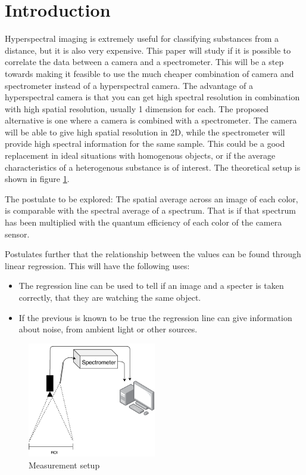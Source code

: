 \section{Introduction}
\label{sec:introduction}
Hyperspectral imaging is extremely useful for classifying substances from a distance, but it is also very expensive. This paper will study if it is possible to correlate the data between a camera and a spectrometer. This will be a step towards making it feasible to use the much cheaper combination of camera and spectrometer instead of a hyperspectral camera. The advantage of a hyperspectral camera is that you can get high spectral resolution in combination with high spatial resolution, usually 1 dimension for each. The proposed alternative is one where a camera is combined with a spectrometer. The camera will be able to give high spatial resolution in 2D, while the spectrometer will provide high spectral information for the same sample. This could be a good replacement in ideal situations with homogenous objects, or if the average characteristics of a heterogenous substance is of interest. The theoretical setup is shown in figure \ref{fig:measurement_setup}. 

The postulate to be explored: 
The spatial average across an image of each color, is comparable with the spectral average of a spectrum. That is if that spectrum has been multiplied with the quantum efficiency of each color of the camera sensor. 

Postulates further that the relationship between the values can be found through linear regression. This will have the following uses: 
\begin{itemize}
    \item The regression line can be used to tell if an image and a specter is taken correctly, that they are watching the same object. 
    \item If the previous is known to be true the regression line can give information about noise, from ambient light or other sources. 
\end{itemize}


\begin{figure}[h]
    \centering
    \includegraphics[width=0.5\textwidth]{figures/pt_setup.pdf}
    \caption{Measurement setup}
    \label{fig:measurement_setup}
\end{figure}

